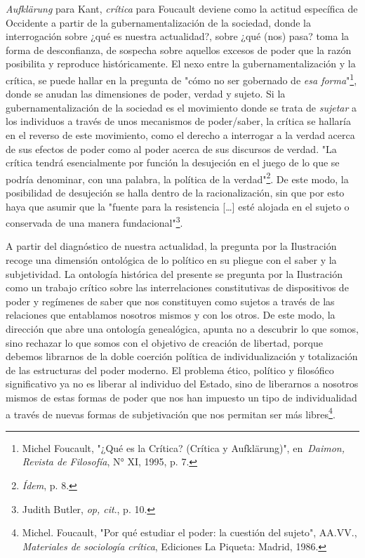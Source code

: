 \documentclass{book}
\begin{document}
\emph{Aufklärung} para Kant, \emph{crítica} para Foucault deviene como
la actitud específica de Occidente a partir de la gubernamentalización
de la sociedad, donde la interrogación sobre ¿qué es nuestra
actualidad?, sobre ¿qué (nos) pasa? toma la forma de desconfianza, de
sospecha sobre aquellos excesos de poder que la razón posibilita y
reproduce históricamente. El nexo entre la gubernamentalización y la
crítica, se puede hallar en la pregunta de "cómo no ser gobernado de
\emph{esa forma}"\footnote{Michel Foucault, "¿Qué es la Crítica?
  (Crítica y Aufklärung)", en~\emph{Daimon, Revista de Filosofía}, N°
  XI, 1995, p. 7.}, donde se anudan las dimensiones de poder, verdad y
sujeto. Si la gubernamentalización de la sociedad es el movimiento donde
se trata de \emph{sujetar} a los individuos a través de unos mecanismos
de poder/saber, la crítica se hallaría en el reverso de este movimiento,
como el derecho a interrogar a la verdad acerca de sus efectos de poder
como al poder acerca de sus discursos de verdad. "La crítica tendrá
esencialmente por función la desujeción en el juego de lo que se podría
denominar, con una palabra, la política de la verdad"\footnote{\emph{Ídem},
  p. 8.}. De este modo, la posibilidad de desujeción se halla dentro de
la racionalización, sin que por esto haya que asumir que la "fuente para
la resistencia {[}\ldots{]} esté alojada en el sujeto o conservada de
una manera fundacional"\footnote{Judith Butler, \emph{op, cit}., p. 10.}.

A partir del diagnóstico de nuestra actualidad, la pregunta por la
Ilustración recoge una dimensión ontológica de lo político en su pliegue
con el saber y la subjetividad. La ontología histórica del presente se
pregunta por la Ilustración como un trabajo crítico sobre las
interrelaciones constitutivas de dispositivos de poder y regímenes de
saber que nos constituyen como sujetos a través de las relaciones que
entablamos nosotros mismos y con los otros. De este modo, la dirección
que abre una ontología genealógica, apunta no a descubrir lo que somos,
sino rechazar lo que somos con el objetivo de creación de libertad,
porque debemos librarnos de la doble coerción política de
individualización y totalización de las estructuras del poder moderno.
El problema ético, político y filosófico significativo ya no es liberar
al individuo del Estado, sino de liberarnos a nosotros mismos de estas
formas de poder que nos han impuesto un tipo de individualidad a través
de nuevas formas de subjetivación que nos permitan ser más
libres\footnote{Michel. Foucault, "Por qué estudiar el poder: la
  cuestión del sujeto", AA.VV., \emph{Materiales de sociología crítica},
  Ediciones La Piqueta: Madrid, 1986.}.
\end{document}
